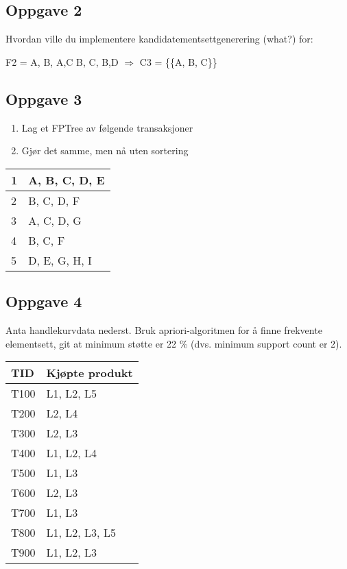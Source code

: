 		\subsection*{Oppgave 2}

			Hvordan ville du implementere kandidatementsettgenerering (what?) for:

			F2 = {{A, B}, {A,C} {B, C}, {B,D}} $\Rightarrow$ C3 = \{\{A, B, C\}\}

		\subsection*{Oppgave 3}

			\begin{enumerate}
				\item Lag et FPTree av følgende transaksjoner
				\item Gjør det samme, men nå uten sortering
			\end{enumerate}

			\begin{table}[H]
				\begin{tabular}{| l | l | }
					\hline
					1 & A, B, C, D, E \\ \hline
					2 & B, C, D, F \\ \hline
					3 & A, C, D, G \\ \hline
					4 & B, C, F \\ \hline
					5 & D, E, G, H, I \\ \hline
				\end{tabular}
			\end{table}

		\subsection*{Oppgave 4}
			Anta handlekurvdata nederst. Bruk apriori-algoritmen for å finne frekvente elementsett,
			git at minimum støtte er 22 \% (dvs. minimum support count er 2).

			\begin{table}[H]
				\begin{tabular}{| l | l | }
					\hline
						{\bf TID} & {\bf Kjøpte produkt} \\ \hline
						T100 & L1, L2, L5 \\ \hline
						T200 & L2, L4 \\ \hline
						T300 & L2, L3 \\ \hline
						T400 & L1, L2, L4 \\ \hline
						T500 & L1, L3 \\ \hline
						T600 & L2, L3 \\ \hline
						T700 & L1, L3 \\ \hline
						T800 & L1, L2, L3, L5 \\ \hline
						T900 & L1, L2, L3 \\ \hline
				\end{tabular}
			\end{table}
